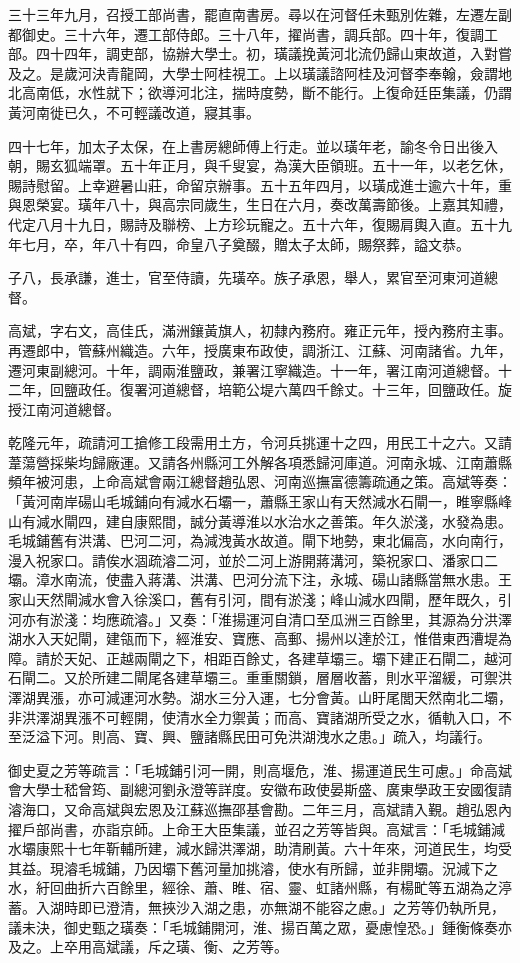 \begin{pinyinscope}
三十三年九月，召授工部尚書，罷直南書房。尋以在河督任未甄別佐雜，左遷左副都御史。三十六年，遷工部侍郎。三十八年，擢尚書，調兵部。四十年，復調工部。四十四年，調吏部，協辦大學士。初，璜議挽黃河北流仍歸山東故道，入對嘗及之。是歲河決青龍岡，大學士阿桂視工。上以璜議諮阿桂及河督李奉翰，僉謂地北高南低，水性就下；欲導河北注，揣時度勢，斷不能行。上復命廷臣集議，仍謂黃河南徙已久，不可輕議改道，寢其事。

四十七年，加太子太保，在上書房總師傅上行走。並以璜年老，諭冬令日出後入朝，賜玄狐端罩。五十年正月，與千叟宴，為漢大臣領班。五十一年，以老乞休，賜詩慰留。上幸避暑山莊，命留京辦事。五十五年四月，以璜成進士逾六十年，重與恩榮宴。璜年八十，與高宗同歲生，生日在六月，奏改萬壽節後。上嘉其知禮，代定八月十九日，賜詩及聯榜、上方珍玩寵之。五十六年，復賜肩輿入直。五十九年七月，卒，年八十有四，命皇八子奠醊，贈太子太師，賜祭葬，謚文恭。

子八，長承謙，進士，官至侍讀，先璜卒。族子承恩，舉人，累官至河東河道總督。

高斌，字右文，高佳氏，滿洲鑲黃旗人，初隸內務府。雍正元年，授內務府主事。再遷郎中，管蘇州織造。六年，授廣東布政使，調浙江、江蘇、河南諸省。九年，遷河東副總河。十年，調兩淮鹽政，兼署江寧織造。十一年，署江南河道總督。十二年，回鹽政任。復署河道總督，培範公堤六萬四千餘丈。十三年，回鹽政任。旋授江南河道總督。

乾隆元年，疏請河工搶修工段需用土方，令河兵挑運十之四，用民工十之六。又請葦蕩營採柴均歸廠運。又請各州縣河工外解各項悉歸河庫道。河南永城、江南蕭縣頻年被河患，上命高斌會兩江總督趙弘恩、河南巡撫富德籌疏通之策。高斌等奏：「黃河南岸碭山毛城鋪向有減水石壩一，蕭縣王家山有天然減水石閘一，睢寧縣峰山有減水閘四，建自康熙間，誠分黃導淮以水治水之善策。年久淤淺，水發為患。毛城鋪舊有洪溝、巴河二河，為減洩黃水故道。閘下地勢，東北偏高，水向南行，漫入祝家口。請俟水涸疏濬二河，並於二河上游開蔣溝河，築祝家口、潘家口二壩。漳水南流，使盡入蔣溝、洪溝、巴河分流下注，永城、碭山諸縣當無水患。王家山天然閘減水會入徐溪口，舊有引河，間有淤淺；峰山減水四閘，歷年既久，引河亦有淤淺：均應疏濬。」又奏：「淮揚運河自清口至瓜洲三百餘里，其源為分洪澤湖水入天妃閘，建瓴而下，經淮安、寶應、高郵、揚州以達於江，惟借東西漕堤為障。請於天妃、正越兩閘之下，相距百餘丈，各建草壩三。壩下建正石閘二，越河石閘二。又於所建二閘尾各建草壩三。重重關鎖，層層收蓄，則水平溜緩，可禦洪澤湖異漲，亦可減運河水勢。湖水三分入運，七分會黃。山盱尾閭天然南北二壩，非洪澤湖異漲不可輕開，使清水全力禦黃；而高、寶諸湖所受之水，循軌入口，不至泛溢下河。則高、寶、興、鹽諸縣民田可免洪湖洩水之患。」疏入，均議行。

御史夏之芳等疏言：「毛城鋪引河一開，則高堰危，淮、揚運道民生可慮。」命高斌會大學士嵇曾筠、副總河劉永澄等詳度。安徽布政使晏斯盛、廣東學政王安國復請濬海口，又命高斌與宏恩及江蘇巡撫邵基會勘。二年三月，高斌請入覲。趙弘恩內擢戶部尚書，亦詣京師。上命王大臣集議，並召之芳等皆與。高斌言：「毛城鋪減水壩康熙十七年靳輔所建，減水歸洪澤湖，助清刷黃。六十年來，河道民生，均受其益。現濬毛城鋪，乃因壩下舊河量加挑濬，使水有所歸，並非開壩。況減下之水，紆回曲折六百餘里，經徐、蕭、睢、宿、靈、虹諸州縣，有楊甿等五湖為之渟蓄。入湖時即已澄清，無挾沙入湖之患，亦無湖不能容之慮。」之芳等仍執所見，議未決，御史甄之璜奏：「毛城鋪開河，淮、揚百萬之眾，憂慮惶恐。」鍾衡條奏亦及之。上卒用高斌議，斥之璜、衡、之芳等。


\end{pinyinscope}
